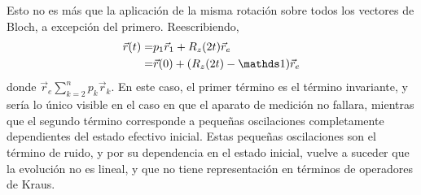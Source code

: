 Esto no es más que la aplicación de la misma rotación sobre todos los vectores de Bloch, a excepción del primero. Reescribiendo,
\begin{align*}
    \vec{r}(t)=&p_{1}\vec{r}_{1}+R_{z}(2t)\vec{r}_{e}\\
    =&\vec{r}(0)+(R_{z}(2t)-\Id)\vec{r}_{e}
\end{align*}
donde $\vec{r}_{e}\sum_{k=2}^{n}p_{k}\vec{r}_{k}$.
En este caso, el primer término es el término invariante, y sería lo único visible en el caso en que el aparato de medición no fallara, mientras que el segundo término corresponde a pequeñas oscilaciones completamente dependientes del estado efectivo inicial. Estas pequeñas oscilaciones son el término de ruido, y por su dependencia en el estado inicial, vuelve a suceder que la evolución no es lineal, y que no tiene representación en términos de operadores de Kraus.

